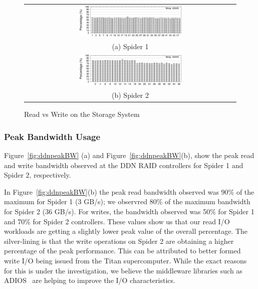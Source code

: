 \begin{figure}[!t]
\begin{center}
\begin{tabular}{c}
{\includegraphics[width=0.5\textwidth]{./figs/spider1-wr-ratio.eps}}\\
{(a) Spider 1}\\
{\includegraphics[width=0.5\textwidth]{./figs/spider2-wr-ratio.eps}}\\
{(b) Spider 2}\\
\end{tabular}
\vspace{-0.1in}
\caption{Read vs Write on the Storage System}
\label{fig:rwratio}
\end{center}
\end{figure}

\subsubsection{Peak Bandwidth Usage}

Figure~\ref{fig:ddnpeakBW} (a) and Figure~\ref{fig:ddnpeakBW}(b), show the
peak read and write bandwidth observed at the DDN RAID controllers for Spider 1
and Spider 2, respectively. 

In Figure~\ref{fig:ddnpeakBW}(b) the peak read bandwidth observed was 90\% of the
maximum for Spider 1 (3 GB/s); we observred 80\% of the maximum bandwidth for 
Spider 2 (36 GB/s). For writes, the bandwidth observed was 50\% for Spider 1 and 70\% for
Spider 2 controllers. These values show us that our read I/O workloads are getting a 
slightly lower peak value of the overall percentage. The silver-lining is that the write
operations on Spider 2 are obtaining a higher percentage of the peak performance. This can be
attributed to better formed write I/O being issued from the Titan supercomputer. While 
the exact reasons for this is under the investigation, we believe the middleware 
libraries such as ADIOS~\cite{adios} are helping to improve the I/O characteristics. 


